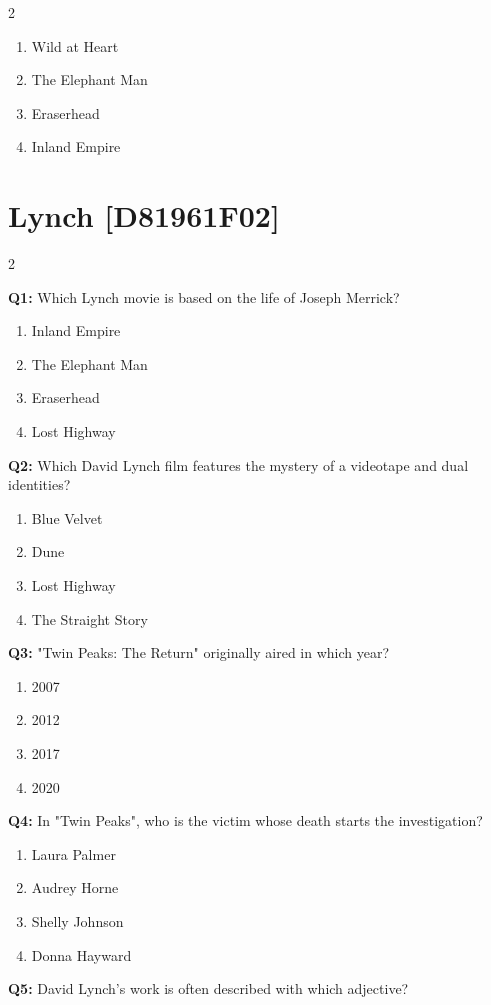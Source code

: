 \documentclass[10pt]{article}
\begin{document}
\begin{multicols}{2}
\begin{enumerate}[label=\arabic*.]
\item Wild at Heart
\item The Elephant Man
\item Eraserhead
\item Inland Empire
\end{enumerate}
\end{multicols}

\newpage

\section*{Lynch \footnotesize [D81961F02]}
\begin{multicols}{2}

\textbf{Q1:} Which Lynch movie is based on the life of Joseph Merrick?

\begin{enumerate}[label=\arabic*.]
\item Inland Empire
\item The Elephant Man
\item Eraserhead
\item Lost Highway
\end{enumerate}
\textbf{Q2:} Which David Lynch film features the mystery of a videotape and dual identities?

\begin{enumerate}[label=\arabic*.]
\item Blue Velvet
\item Dune
\item Lost Highway
\item The Straight Story
\end{enumerate}
\textbf{Q3:} "Twin Peaks: The Return" originally aired in which year?

\begin{enumerate}[label=\arabic*.]
\item 2007
\item 2012
\item 2017
\item 2020
\end{enumerate}
\textbf{Q4:} In "Twin Peaks", who is the victim whose death starts the investigation?

\begin{enumerate}[label=\arabic*.]
\item Laura Palmer
\item Audrey Horne
\item Shelly Johnson
\item Donna Hayward
\end{enumerate}
\textbf{Q5:} David Lynch's work is often described with which adjective?


\end{multicols}
\end{document}
